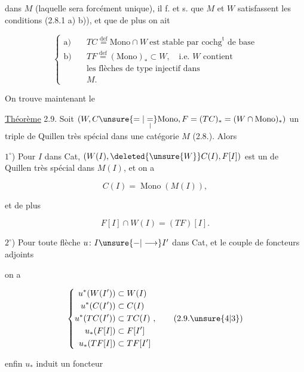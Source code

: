 
dans $M$ (laquelle sera forcément unique), il f. et
s. que $M$ et $W$ satisfassent les conditions
(2.8.1 a) b)), et que de plus on ait

\[
\left\{\begin{aligned}
\text{a)}\quad &TC\overset{\mathrm{def}}{=}\mathrm{Mono}\cap W\ \text{est stable par cochg}^{\mathrm t}\text{ de base}\\
\text{b)}\quad &TF\overset{\mathrm{def}}{=}(\mathrm{Mono})_*\subset W,\quad\text{i.e. }W\text{ contient}\\
 &\text{les flèches de type injectif dans}\\
 &M.
\end{aligned}\right.\tag*{(2.8.2)}
\]


On trouve maintenant le

\uline{Théorème} 2.9. Soit $(W,C\unsure{=|\underset{\vert}{=}}\mathrm{Mono},F=(TC)_*=(W\cap\mathrm{Mono})_*)$
un triple de Quillen très spécial dans une
catégorie $M$ (2.8.). Alors 

$1^\circ$) Pour  $I$ dans Cat, $(W(I),\deleted{\unsure{W}}C(I),F[I])$
est un  de Quillen très spécial
dans $M(I)$, et on a 

\[
 C(I)=\operatorname{Mono}(M(I)),\tag*{(2.9.1)}
\]

et de plus

\[
 F[I]\cap W(I)=(TF)[I].\tag*{(2.9.2)}
\]

$2^\circ$) Pour toute flèche $u\colon I\unsure{-|\longrightarrow}I'$ dans Cat,
et  le couple de foncteurs adjoints


on a

\[
\left\{\begin{aligned}
 u^*(W(I'))&\subset W(I)\\
 u^*(C(I'))&\subset C(I)\\
 u^*(TC(I'))&\subset TC(I)\\
 u_*(F[I])&\subset F[I']\\
 u_*(TF[I])&\subset TF[I']
\end{aligned}\right.,\tag*{(2.9.\unsure{4|3})}
\]

enfin $u_*$ induit un foncteur
